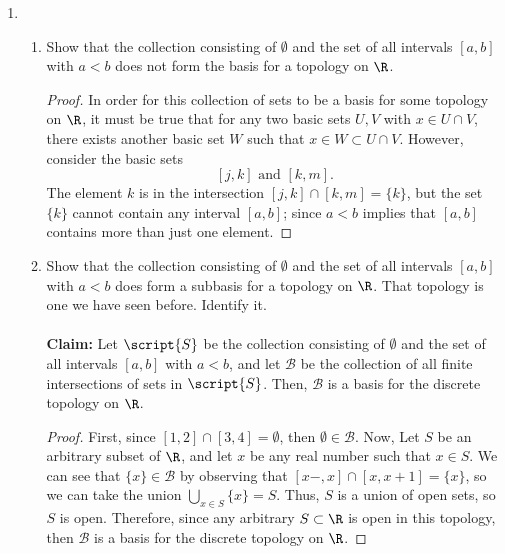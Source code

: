 \documentclass[letterpaper]{article}
\newcommand{\B}{\mathcal{B}}
\begin{document}
\begin{enumerate}
\item 
	\begin{enumerate}
	\item Show that the collection consisting of $\emptyset$ and the set of all intervals $[a,b]$ with $a < b$ does not form the basis for a topology on $\R$.
	\begin{proof}
	In order for this collection of sets to be a basis for some topology on $\R$, it must be true that for any two basic sets $U,V$ with $x\in U\cap V$, there exists another basic set $W$ such that $x\in W \subset U\cap V$. However, consider the basic sets 
	$$[j,k]\text{ and }[k,m].$$
	The element $k$ is in the intersection $[j,k]\cap[k,m]=\{k\}$, but the set $\{k\}$ cannot contain any interval $[a,b]$; since $a<b$ implies that $[a,b]$ contains more than just one element. 
	\end{proof}
	
	\item Show that the collection consisting of $\emptyset$ and the set of all intervals $[a,b]$ with $a < b$ does form a subbasis for a topology on $\R$.  That topology is one we have seen before. Identify it.\\
	\\
	\textbf{Claim: }Let $\script{S}$ be the collection consisting of $\emptyset$ and the set of all intervals $[a,b]$ with $a < b$, and let $\B$ be the collection of all finite intersections of sets in $\script{S}$. Then, $\B$ is a basis for the discrete topology on $\R$.
	\begin{proof} First, since $[1,2]\cap[3,4]=\emptyset$, then $\emptyset\in\B$. Now, Let $S$ be an arbitrary subset of $\R$, and let $x$ be any real number such that $x\in S$. We can see that $\{x\}\in\B$ by observing that $[x-,x]\cap[x,x+1]=\{x\}$, so we can take the union $\bigcup\limits_{x\in S}\{x\}=S$. Thus, $S$ is a union of open sets, so $S$ is open. Therefore, since any arbitrary $S\subset\R$ is open in this topology, then $\B$ is a basis for the discrete topology on $\R$.
	\end{proof}
	
	\end{enumerate}

\end{enumerate}
\end{document}
